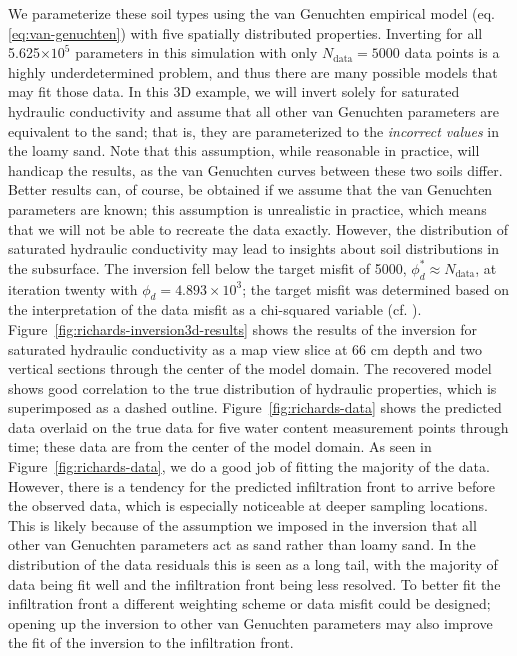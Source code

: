 \documentclass[preprint,review,3p,times,onecolumn,authoryear]{elsarticle}
\begin{document}
We parameterize these soil types using the van Genuchten empirical model (eq. \ref{eq:van-genuchten}) with five spatially distributed properties. Inverting for all 5.625$\times10^5$ parameters in this simulation with only $N_\text{data}=5000$ data points is a highly underdetermined problem, and thus there are many possible models that may fit those data. In this 3D example, we will invert solely for saturated hydraulic conductivity and assume that all other van Genuchten parameters are equivalent to the sand; that is, they are parameterized to the \emph{incorrect values} in the loamy sand. Note that this assumption, while reasonable in practice, will handicap the results, as the van Genuchten curves between these two soils differ. Better results can, of course, be obtained if we assume that the van Genuchten parameters are known; this assumption is unrealistic in practice, which means that we will not be able to recreate the data exactly. However, the distribution of saturated hydraulic conductivity may lead to insights about soil distributions in the subsurface. The inversion fell below the target misfit of 5000, $\phi_d^* \approx N_\text{data}$, at iteration twenty with $\phi_d=4.893\times10^3$; the target misfit was determined based on the interpretation of the data misfit as a chi-squared variable (cf. \cite{DougTutorial}).  Figure~\ref{fig:richards-inversion3d-results} shows the results of the inversion for saturated hydraulic conductivity as a map view slice at 66 cm depth and two vertical sections through the center of the model domain. The recovered model shows good correlation to the true distribution of hydraulic properties, which is superimposed as a dashed outline. Figure~\ref{fig:richards-data} shows the predicted data overlaid on the true data for five water content measurement points through time; these data are from the center of the model domain. As seen in Figure~\ref{fig:richards-data}, we do a good job of fitting the majority of the data. However, there is a tendency for the predicted infiltration front to arrive before the observed data, which is especially noticeable at deeper sampling locations. This is likely because of the assumption we imposed in the inversion that all other van Genuchten parameters act as sand rather than loamy sand. In the distribution of the data residuals this is seen as a long tail, with the majority of data being fit well and the infiltration front being less resolved. To better fit the infiltration front a different weighting scheme or data misfit could be designed; opening up the inversion to other van Genuchten parameters may also improve the fit of the inversion to the infiltration front.
\end{document}
